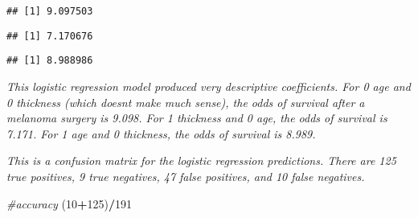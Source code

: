 \documentclass[]{article}
\newenvironment{Shaded}{\begin{snugshade}}{\end{snugshade}}
\newcommand{\CommentTok}[1]{\textcolor[rgb]{0.56,0.35,0.01}{\textit{#1}}}
\newcommand{\DecValTok}[1]{\textcolor[rgb]{0.00,0.00,0.81}{#1}}
\newcommand{\FloatTok}[1]{\textcolor[rgb]{0.00,0.00,0.81}{#1}}
\newcommand{\KeywordTok}[1]{\textcolor[rgb]{0.13,0.29,0.53}{\textbf{#1}}}
\newcommand{\NormalTok}[1]{#1}
\newcommand{\OperatorTok}[1]{\textcolor[rgb]{0.81,0.36,0.00}{\textbf{#1}}}
\begin{document}
\begin{verbatim}
## [1] 9.097503
\end{verbatim}

\begin{Shaded}
\end{Shaded}

\begin{verbatim}
## [1] 7.170676
\end{verbatim}

\begin{Shaded}
\end{Shaded}

\begin{verbatim}
## [1] 8.988986
\end{verbatim}

\emph{This logistic regression model produced very descriptive
coefficients. For 0 age and 0 thickness (which doesnt make much sense),
the odds of survival after a melanoma surgery is 9.098. For 1 thickness
and 0 age, the odds of survival is 7.171. For 1 age and 0 thickness, the
odds of survival is 8.989.}

\begin{Shaded}
\end{Shaded}

\emph{This is a confusion matrix for the logistic regression
predictions. There are 125 true positives, 9 true negatives, 47 false
positives, and 10 false negatives.}

\begin{Shaded}
\begin{Highlighting}[]
\CommentTok{#accuracy}
\NormalTok{(}\DecValTok{10}\OperatorTok{+}\DecValTok{125}\NormalTok{)}\OperatorTok{/}\DecValTok{191}
\end{Highlighting}
\end{Shaded}
\end{document}
